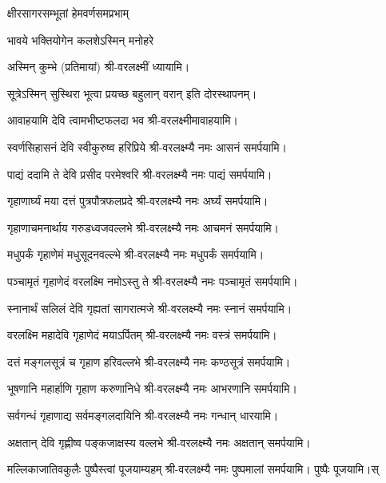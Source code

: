 \begin{center}

{क्षीरसागरसम्भूतां हेमवर्णसमप्रभाम्}

{भावये भक्तियोगेन कलशेऽस्मिन् मनोहरे} 

अस्मिन् कुम्भे (प्रतिमायां) श्री-वरलक्ष्मीं ध्यायामि।
\medskip


{सूत्रेऽस्मिन् सुस्थिरा भूत्वा प्रयच्छ बहुलान् वरान्} 
इति दोरस्थापनम्।\medskip

{आवाहयामि देवि त्वामभीष्टफलदा भव}
श्री-वरलक्ष्मीमावाहयामि।

{स्वर्णसिहासनं देवि स्वीकुरुष्व हरिप्रिये} 
श्री-वरलक्ष्म्यै नमः आसनं समर्पयामि।


{पाद्यं ददामि ते देवि प्रसीद परमेश्वरि}
श्री-वरलक्ष्म्यै नमः पाद्यं समर्पयामि।\medskip

{गृहाणार्घ्यं मया दत्तं पुत्रपौत्रफलप्रदे}
श्री-वरलक्ष्म्यै नमः अर्घ्यं समर्पयामि।\medskip

{गृहाणाचमनार्थाय गरुडध्वजवल्लभे}
श्री-वरलक्ष्म्यै नमः आचमनं समर्पयामि।\medskip

{मधुपर्कं गृहाणेमं मधुसूदनवल्ल्भे}
श्री-वरलक्ष्म्यै नमः मधुपर्कं समर्पयामि।\medskip

{पञ्चामृतं गृहाणेदं वरलक्ष्मि नमोऽस्तु ते}
श्री-वरलक्ष्म्यै नमः पञ्चामृतं समर्पयामि।\medskip

{स्नानार्थं सलिलं देवि गृह्यतां सागरात्मजे}
श्री-वरलक्ष्म्यै नमः स्नानं समर्पयामि।\medskip

{वरलक्ष्मि महादेवि गृहाणेदं मयाऽर्पितम्}
श्री-वरलक्ष्म्यै नमः वस्त्रं समर्पयामि।\medskip

{दत्तं मङ्गलसूत्रं च गृहाण हरिवल्लभे}
श्री-वरलक्ष्म्यै नमः कण्ठसूत्रं समर्पयामि।\medskip

{भूषणानि महार्हाणि गृहाण करुणानिधे}
श्री-वरलक्ष्म्यै नमः आभरणानि समर्पयामि।\medskip

{सर्वगन्धं गृहाणाद्य सर्वमङ्गलदायिनि}
श्री-वरलक्ष्म्यै नमः गन्धान् धारयामि।\medskip

{अक्षतान् देवि गृह्णीष्व पङ्कजाक्षस्य वल्लभे}
श्री-वरलक्ष्म्यै नमः अक्षतान् समर्पयामि।\medskip

{मल्लिकाजातिवकुलैः पुष्पैस्त्वां पूजयाम्यहम्}
श्री-वरलक्ष्म्यै नमः पुष्पमालां समर्पयामि। पुष्पैः पूजयामि।स्\medskip

 
\end{center}


